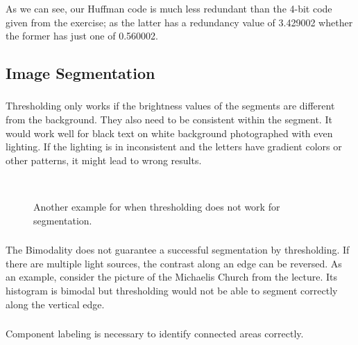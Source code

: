 \documentclass[a4paper,12pt]{article}
\begin{document}
	
	\noindent As we can see, our Huffman code is much less redundant than the 4-bit code given from the exercise; as the latter has a redundancy value of 3.429002 whether the former has just one of 0.560002.
	
	\subsection{Image Segmentation}
	\subsubsection{}
	Thresholding only works if the brightness values of the segments are different from the background. They also need to be consistent within the segment. It would work well for black text on white background photographed with even lighting. If the lighting is in inconsistent and the letters have gradient colors or other patterns, it might lead to wrong results.
	\begin{figure}[h]
	\center
	\\
	\caption{Another example for when thresholding does not work for segmentation.}
	\end{figure}
	
	\subsubsection{}
	The Bimodality does not guarantee a successful segmentation by thresholding. If there are multiple light sources, the contrast along an edge can be reversed. As an example, consider the picture of the Michaelis Church from the lecture. Its histogram is bimodal but thresholding would not be able to segment correctly along the vertical edge.
	
	\subsubsection{}	
	Component labeling is necessary to identify connected areas correctly.
	
\end{document}
